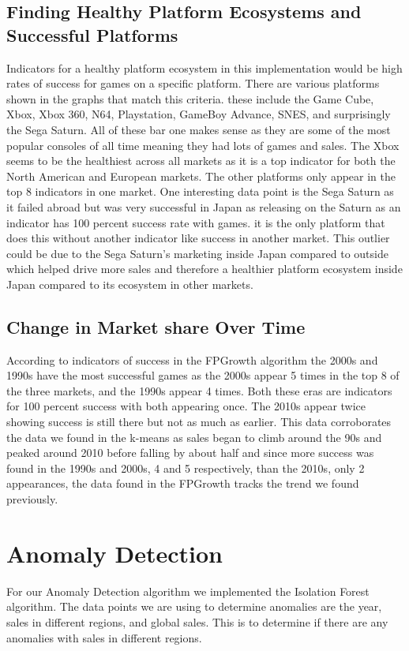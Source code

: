 \documentclass[conference]{IEEEtran}
\begin{document}
\subsection{Finding Healthy Platform Ecosystems and Successful Platforms}
Indicators for a healthy platform ecosystem in this implementation would be high rates of success for games on a specific platform. There are various platforms shown in the graphs that match this criteria. these include the Game Cube, Xbox, Xbox 360, N64, Playstation, GameBoy Advance, SNES, and surprisingly the Sega Saturn. All of these bar one makes sense as they are some of the most popular consoles of all time meaning they had lots of games and sales. The Xbox seems to be the healthiest across all markets as it is a top indicator for both the North American and European markets. The other platforms only appear in the top 8 indicators in one market. One interesting data point is the Sega Saturn as it failed abroad but was very successful in Japan as releasing on the Saturn as an indicator has 100 percent success rate with games. it is the only platform that does this without another indicator like success in another market. This outlier could be due to the Sega Saturn's marketing inside Japan compared to outside which helped drive more sales and therefore a healthier platform ecosystem inside Japan compared to its ecosystem in other markets.

\subsection{Change in Market share Over Time}
According to indicators of success in the FPGrowth algorithm the 2000s and 1990s have the most successful games as the 2000s appear 5 times in the top 8 of the three markets, and the 1990s appear 4 times. Both these eras are indicators for 100 percent success with both appearing once. The 2010s appear twice showing success is still there but not as much as earlier. This data corroborates the data we found in the k-means as sales began to climb around the 90s and peaked around 2010 before falling by about half and since more success was found in the 1990s and 2000s, 4 and 5 respectively, than the 2010s, only 2 appearances, the data found in the FPGrowth tracks the trend we found previously.

\section{Anomaly Detection}
For our Anomaly Detection algorithm we implemented the Isolation Forest algorithm. The data points we are using to determine anomalies are the year, sales in different regions, and global sales. This is to determine if there are any anomalies with sales in different regions.
\end{document}
